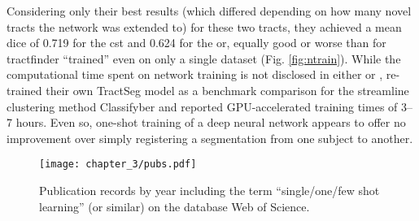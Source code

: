 Considering only their best results (which differed depending on how many novel tracts the network was extended to) for these two tracts, they achieved a mean \gls{dice} of 0.719 for the \gls{cst} and 0.624 for the \gls{or}, equally good or worse than for tractfinder ``trained'' even on only a single dataset (Fig. \ref{fig:ntrain}).
While the computational time spent on network training is not disclosed in either \textcite{Liu2023a} or \textcite{Wasserthal2018}, \textcite{Berto2021} re-trained their own TractSeg model as a benchmark comparison for the streamline clustering method Classifyber and reported GPU-accelerated training times of 3--7 hours.
Even so, one-shot training of a deep neural network appears to offer no improvement over simply registering a segmentation from one subject to another.

\begin{SCfigure}[][h!]
  \centering
  \texttt{[image: chapter\_3/pubs.pdf]}
  \caption{Publication records by year including the term ``single/one/few shot learning'' (or similar) on the database Web of Science.}
  \label{fig:pubs}
\end{SCfigure}
